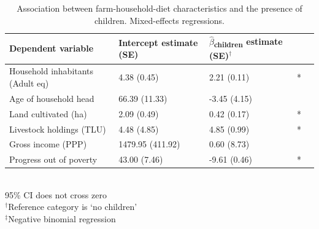 \begin{table}[H]
  \captionsetup{singlelinecheck = false, justification=justified}
  \caption{
  Association between farm-household-diet characteristics and the presence of children. Mixed-effects regressions.
  }
  \label{tab:C_14}
  \small
\begin{tabular}{L{5cm} C{2.5cm} C{2.5cm} C{2cm} C{2cm}}
\toprule
Dependent variable & Intercept estimate (SE) & $\hat{\beta}$\textsubscript{children} estimate (SE)$^{\dag}$ &  \\
\midrule
Household inhabitants (Adult eq) & 4.38 (0.45) & 2.21 (0.11) & * \\
Age of household head & 66.39 (11.33) & -3.45 (4.15) & \\
Land cultivated (ha) & 2.09 (0.49) & 0.42 (0.17) & * \\
Livestock holdings (TLU) & 4.48 (4.85) & 4.85 (0.99) & * \\
Gross income (PPP) & 1479.95 (411.92) & 0.60 (8.73) &  \\
Progress out of poverty & 43.00 (7.46) & -9.61 (0.46) & * \\
\bottomrule
\end{tabular}
\footnotesize
\raggedright
\\
95\% CI does not cross zero \\
$^{\dag}$Reference category is `no children' \\
$^{\ddag}$Negative binomial regression
\end{table}


